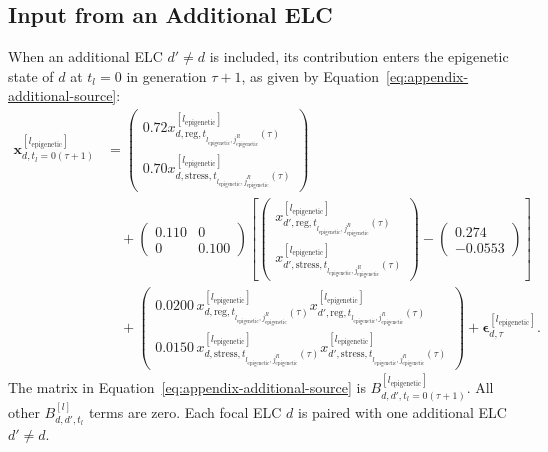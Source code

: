 \documentclass[11pt]{article}
\begin{document}
\subsection{Input from an Additional ELC}
When an additional ELC $d'\neq d$ is included, its contribution enters the epigenetic state of $d$ at $t_l=0$ in generation $\tau+1$, as given by Equation~\ref{eq:appendix-additional-source}:
\begin{equation}
\begin{aligned}
\mathbf{x}^{[l_{\mathrm{epigenetic}}]}_{d,t_l=0(\tau+1)}
&=
\begin{pmatrix}
0.72x^{[l_{\mathrm{epigenetic}}]}_{d,\mathrm{reg},t_{l_{\mathrm{epigenetic}},j_{\mathrm{epigenetic}}^R}(\tau)}\\
0.70x^{[l_{\mathrm{epigenetic}}]}_{d,\mathrm{stress},t_{l_{\mathrm{epigenetic}},j_{\mathrm{epigenetic}}^R}(\tau)}
\end{pmatrix}\\
&\quad+
\begin{pmatrix}
0.110&0\\
0&0.100
\end{pmatrix}
\left[
\begin{pmatrix}
x^{[l_{\mathrm{epigenetic}}]}_{d',\mathrm{reg},t_{l_{\mathrm{epigenetic}},j_{\mathrm{epigenetic}}^R}(\tau)}\\
x^{[l_{\mathrm{epigenetic}}]}_{d',\mathrm{stress},t_{l_{\mathrm{epigenetic}},j_{\mathrm{epigenetic}}^R}(\tau)}
\end{pmatrix}
-
\begin{pmatrix}
0.274\\
-0.0553
\end{pmatrix}
\right]\\
&\quad+
\begin{pmatrix}
0.0200\,
x^{[l_{\mathrm{epigenetic}}]}_{d,\mathrm{reg},t_{l_{\mathrm{epigenetic}},j_{\mathrm{epigenetic}}^R}(\tau)}
x^{[l_{\mathrm{epigenetic}}]}_{d',\mathrm{reg},t_{l_{\mathrm{epigenetic}},j_{\mathrm{epigenetic}}^R}(\tau)}\\
0.0150\,
x^{[l_{\mathrm{epigenetic}}]}_{d,\mathrm{stress},t_{l_{\mathrm{epigenetic}},j_{\mathrm{epigenetic}}^R}(\tau)}
x^{[l_{\mathrm{epigenetic}}]}_{d',\mathrm{stress},t_{l_{\mathrm{epigenetic}},j_{\mathrm{epigenetic}}^R}(\tau)}
\end{pmatrix}
+
\boldsymbol{\epsilon}^{[l_{\mathrm{epigenetic}}]}_{d,\tau}.
\end{aligned}
\label{eq:appendix-additional-source}
\end{equation}
The matrix in Equation~\ref{eq:appendix-additional-source} is $B^{[l_{\mathrm{epigenetic}}]}_{d,d',t_l=0(\tau+1)}$. All other $B^{[l]}_{d,d',t_l}$ terms are zero. Each focal ELC $d$ is paired with one additional ELC $d'\neq d$.
\end{document}
